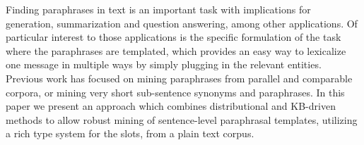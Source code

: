 Finding paraphrases in text is an important task with implications for generation, summarization and question answering, among other applications. Of particular interest to those applications is the specific formulation of the task where the paraphrases are templated, which provides an easy way to lexicalize one message in multiple ways by simply plugging in the relevant entities. Previous work has focused on mining paraphrases from parallel and comparable corpora, or mining very short sub-sentence synonyms and paraphrases. In this paper we present an approach which combines distributional and KB-driven methods to allow robust mining of sentence-level paraphrasal templates, utilizing a rich type system for the slots, from a plain text corpus.
